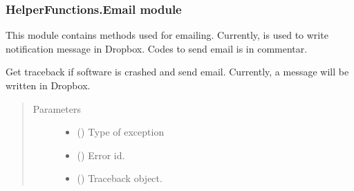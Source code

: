 \documentclass[letterpaper,10pt,english]{sphinxmanual}
\begin{document}
\begin{DUlineblock}{0em}
\item[] 
\end{DUlineblock}


\subsubsection{HelperFunctions.Email module}
\label{\detokenize{NoSeMazeControl/HelperFunctions:module-HelperFunctions.Email}}\label{\detokenize{NoSeMazeControl/HelperFunctions:helperfunctions-email-module}}
\sphinxAtStartPar
This module contains methods used for e\sphinxhyphen{}mailing. Currently, is used to write
notification message in Dropbox. Codes to send e\sphinxhyphen{}mail is in commentar.

\begin{fulllineitems}
\label{\detokenize{NoSeMazeControl/HelperFunctions:HelperFunctions.Email.crash_error}}
\pysigstartsignatures
{}
\pysigstopsignatures
\sphinxAtStartPar
Get traceback if software is crashed and send e\sphinxhyphen{}mail. Currently, a message
will be written in Dropbox.
\begin{quote}\begin{description}
\item[{Parameters}] \leavevmode\begin{itemize}
\item {} 
\sphinxAtStartPar
{} () \textendash{} Type of exception

\item {} 
\sphinxAtStartPar
{} () \textendash{} Error id.

\item {} 
\sphinxAtStartPar
{} () \textendash{} Traceback object.

\end{itemize}

\end{description}\end{quote}

\end{fulllineitems}
\end{document}
